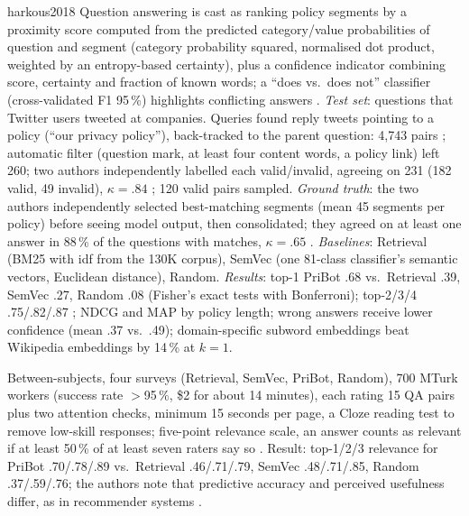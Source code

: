 \begin{papercard}{harkous2018}
 Question answering is cast as ranking policy segments by a proximity score computed from the predicted category/value probabilities of question and segment (category probability squared, normalised dot product, weighted by an entropy-based certainty), plus a confidence indicator combining score, certainty and fraction of known words; a ``does vs.\ does not'' classifier (cross-validated F1 95\,\%) highlights conflicting answers . \emph{Test set}: questions that Twitter users tweeted at companies. Queries found reply tweets pointing to a policy (``our privacy policy''), back-tracked to the parent question: 4,743 pairs ; automatic filter (question mark, at least four content words, a policy link) left 260; two authors independently labelled each valid/invalid, agreeing on 231 (182 valid, 49 invalid), $\kappa=.84$ ; 120 valid pairs sampled. \emph{Ground truth}: the two authors independently selected best-matching segments (mean 45 segments per policy) before seeing model output, then consolidated; they agreed on at least one answer in 88\,\% of the questions with matches, $\kappa=.65$ . \emph{Baselines}: Retrieval (BM25 with idf from the 130K corpus), SemVec (one 81-class classifier's semantic vectors, Euclidean distance), Random. \emph{Results}: top-1 PriBot .68 vs.\ Retrieval .39, SemVec .27, Random .08 (Fisher's exact tests with Bonferroni); top-2/3/4 .75/.82/.87 ; NDCG and MAP by policy length; wrong answers receive lower confidence (mean .37 vs.\ .49); domain-specific subword embeddings beat Wikipedia embeddings by 14\,\% at $k=1$.

 Between-subjects, four surveys (Retrieval, SemVec, PriBot, Random), 700 MTurk workers (success rate $>$95\,\%, \$2 for about 14 minutes), each rating 15 QA pairs plus two attention checks, minimum 15 seconds per page, a Cloze reading test to remove low-skill responses; five-point relevance scale, an answer counts as relevant if at least 50\,\% of at least seven raters say so . Result: top-1/2/3 relevance for PriBot .70/.78/.89 vs.\ Retrieval .46/.71/.79, SemVec .48/.71/.85, Random .37/.59/.76; the authors note that predictive accuracy and perceived usefulness differ, as in recommender systems .


\end{papercard}
